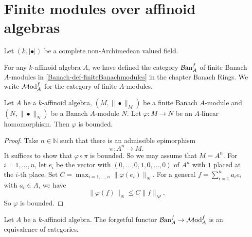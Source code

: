 \section{Finite modules over affinoid algebras}
Let $(k,|\bullet|)$ be a complete non-Archimedean valued field. 

For any $k$-affinoid algebra $A$, we have defined the category $\mathcal{B}\mathrm{an}_A^f$ of finite Banach $A$-modules in \cref{Banach-def-finiteBanachmodules} in the chapter Banach Rings. We write $\mathcal{M}\mathrm{od}_A^f$ for the category of finite $A$-modules. 

\begin{lemma}\label{lma-finiteBanachmodulemapbdd}
    Let $A$ be a $k$-affinoid algebra, $(M,\|\bullet\|_M)$ be a finite Banach $A$-module and $(N,\|\bullet\|_N)$ be a Banach $A$-module $N$.
    Let $\varphi:M\rightarrow N$ be an $A$-linear homomorphism. Then $\varphi$ is bounded.
\end{lemma}
\begin{proof}
    Take $n\in \mathbb{N}$ such that there is an admissible epimorphism 
    \[
        \pi:A^n\rightarrow M.  
    \]   
    It suffices to show that $\varphi\circ\pi$ is bounded. So we may assume that $M=A^n$. For $i=1,\ldots,n$, let $e_i$ be the vector with $(0,\ldots,0,1,0,\ldots,0)$ of $A^n$ with $1$ placed at the $i$-th place.
    Set $C=\max_{i=1,\ldots,n} \|\varphi(e_i)\|_N$. For a general $f=\sum_{i=1}^n a_i e_i$ with $a_i\in A$, we have
    \[
        \|\varphi(f)\|_N\leq C\|f\|_M.
    \]
    So $\varphi$ is bounded.
\end{proof}

\begin{proposition}\label{prop-finteBanachAmoduleequivfinitemodule}
    Let $A$ be a $k$-affinoid algebra. 
    The forgetful functor $\mathcal{B}\mathrm{an}_A^f\rightarrow \mathcal{M}\mathrm{od}_A^f$ is an equivalence of categories.
\end{proposition}

